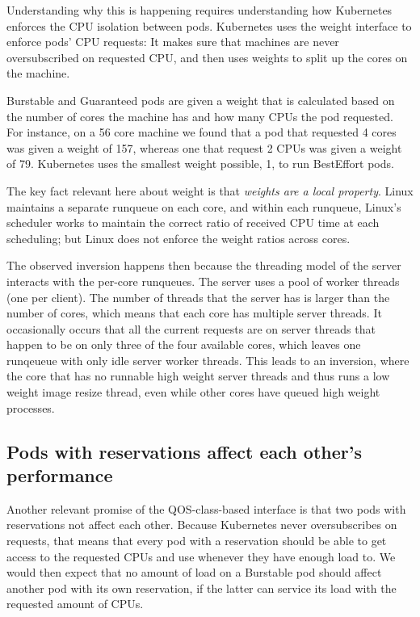 Understanding why this is happening requires understanding how Kubernetes
enforces the CPU isolation between pods. Kubernetes uses the \cgroups{} weight
interface to enforce pods' CPU requests: It makes sure that machines are never
oversubscribed on requested CPU, and then uses weights to split up the cores on
the machine.

Burstable and Guaranteed pods are given a weight that is calculated based on the
number of cores the machine has and how many CPUs the pod requested. For
instance, on a 56 core machine we found that a pod that requested 4 cores was
given a weight of 157, whereas one that request 2 CPUs was given a weight of 79.
Kubernetes uses the smallest weight possible, 1, to run BestEffort pods.

The key fact relevant here about \cgroups{} weight is that \textit{weights are a
local property}. Linux maintains a separate runqueue on each core, and within
each runqueue, Linux's scheduler works to maintain the correct ratio of received
CPU time at each scheduling; but Linux does not enforce the weight ratios across
cores.

The observed inversion happens then because the threading model of the server
interacts with the per-core runqueues. The server uses a pool of worker threads
(one per client). The number of threads that the server has is larger than the
number of cores, which means that each core has multiple server threads. It
occasionally occurs that all the current requests are on server threads that
happen to be on only three of the four available cores, which leaves one
runqeueue with only idle server worker threads. This leads to an inversion,
where the core that has no runnable high weight server threads and thus runs a
low weight image resize thread, even while other cores have queued high weight
processes.


\subsection{Pods with reservations affect each other's performance}

Another relevant promise of the QOS-class-based interface is that two pods with
reservations not affect each other. Because Kubernetes never oversubscribes on
requests, that means that every pod with a reservation should be able to get
access to the requested CPUs and use whenever they have enough load to. We would
then expect that no amount of load on a Burstable pod should affect another pod
with its own reservation, if the latter can service its load with the requested
amount of CPUs.


